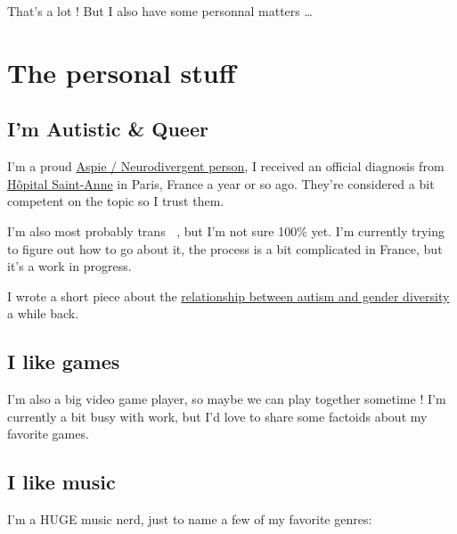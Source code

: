 \documentclass[
  letterpaper,
  DIV=11,
  numbers=noendperiod]{scrreprt}
\begin{document}
That's a lot ! But I also have some personnal matters \ldots{}


\hypertarget{the-personal-stuff}{%
\chapter{The personal stuff}\label{the-personal-stuff}}

\hypertarget{im-autistic-queer}{%
\section{I'm Autistic \& Queer}\label{im-autistic-queer}}

I'm a proud
\href{https://www.health.harvard.edu/blog/what-is-neurodiversity-202111232645}{Aspie
/ Neurodivergent person}, I received an official diagnosis from
\href{https://www.hopital-saint-anne.fr/}{Hôpital Saint-Anne} in Paris,
France a year or so ago. They're considered a bit competent on the topic
so I trust them.

I'm also most probably trans 🏳️‍⚧️, but I'm not sure 100\% yet. I'm
currently trying to figure out how to go about it, the process is a bit
complicated in France, but it's a work in progress.

I wrote a short piece about the
\href{https://write.as/arnov/bayes-can-tell-you-youre-transgender}{relationship
between autism and gender diversity} a while back.

\hypertarget{i-like-games}{%
\section{I like games}\label{i-like-games}}

I'm also a big video game player, so maybe we can play together sometime
! I'm currently a bit busy with work, but I'd love to share some
factoids about my favorite games.

\hypertarget{i-like-music}{%
\section{I like music}\label{i-like-music}}

I'm a HUGE music nerd, just to name a few of my favorite genres:
\end{document}
